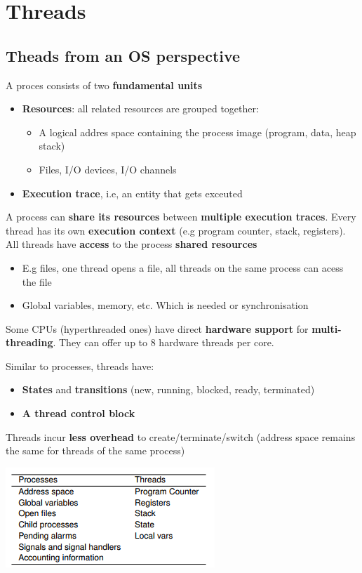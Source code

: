 \documentclass{article}
\begin{document}
\section{Threads}

\subsection{Theads from an OS perspective}
\begin{flushleft}
A proces consists of two \textbf{fundamental units}
\begin{itemize}
	\item \textbf{Resources}: all related resources are grouped together:
	\begin{itemize}
		\item A logical addres space containing the process image (program, data, heap stack)
		\item Files, I/O devices, I/O channels
	\end{itemize}
	\item \textbf{Execution trace}, i.e, an entity that gets exceuted
\end{itemize}
A process can \textbf{share its resources} between \textbf{multiple execution traces}. Every thread has its own \textbf{execution context} (e.g program counter, stack, registers).\\
All threads have \textbf{access} to the process \textbf{shared resources}
\begin{itemize}
	\item E.g files, one thread opens a file, all threads on the same process can acess the file
	\item Global variables, memory, etc. Which is needed or synchronisation
\end{itemize}
Some CPUs (hyperthreaded ones) have direct \textbf{hardware support} for \textbf{multi-threading}. They can offer up to 8 hardware threads per core.
\end{flushleft}
\bigskip


\begin{multicols}{2}
Similar to processes, threads have:
\begin{itemize}
	\item \textbf{States} and \textbf{transitions} (new, running, blocked, ready, terminated)
	\item \textbf{A thread control block}
\end{itemize}
Threads incur \textbf{less overhead} to create/terminate/switch (address space remains the same for threads of the same process)
\smallskip
\begin{center}
\includegraphics[scale=0.5]{Selection_007.png}
\end{center}
\end{multicols}
\end{document}
